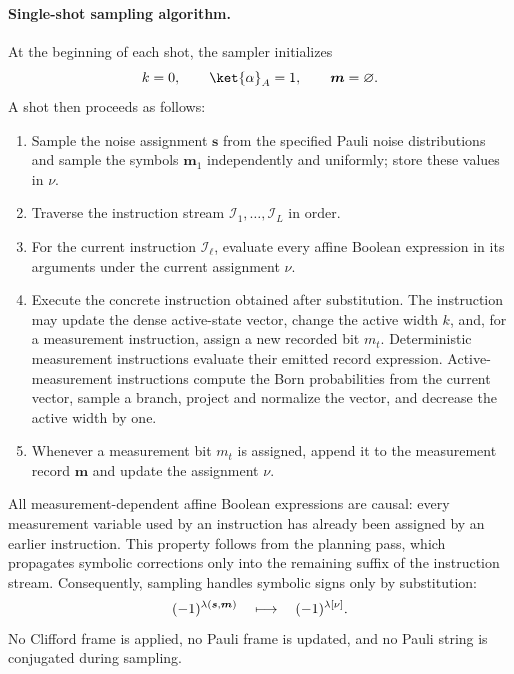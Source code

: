 \documentclass[a4paper,onecolumn,unpublished]{quantumarticle}
\DeclarePairedDelimiter\rbra{\lparen}{\rparen}
\begin{document}
\paragraph{Single-shot sampling algorithm.}
At the beginning of each shot, the sampler initializes
\begin{equation*}
    k=0,
    \qquad
    \ket{\alpha}_A = 1,
    \qquad
    \bm{m}=\varnothing.
\end{equation*}
A shot then proceeds as follows:
\begin{enumerate}
    \item Sample the noise assignment $\bm{s}$ from the specified Pauli noise distributions and sample the symbols $\bm{m}_1$ independently and uniformly; store these values in $\nu$.

    \item Traverse the instruction stream
    $\mathcal{I}_1,\ldots,\mathcal{I}_L$ in order.

    \item For the current instruction $\mathcal{I}_\ell$, evaluate every affine Boolean expression in its arguments under the current assignment $\nu$.

    \item Execute the concrete instruction obtained after substitution. The instruction may update the dense active-state vector, change the active width $k$, and, for a measurement instruction, assign a new recorded bit $m_t$. Deterministic measurement instructions evaluate their emitted record expression. Active-measurement instructions compute the Born probabilities from the current vector, sample a branch, project and normalize the vector, and decrease the active width by one.

    \item Whenever a measurement bit $m_t$ is assigned, append it to the measurement record $\bm{m}$ and update the assignment $\nu$.
\end{enumerate}
All measurement-dependent affine Boolean expressions are causal: every measurement variable used by an instruction has already been assigned by an earlier instruction.
This property follows from the planning pass, which propagates symbolic corrections only into the remaining suffix of the instruction stream.
Consequently, sampling handles symbolic signs only by substitution:
\begin{equation*}
    \rbra{-1}^{\lambda\rbra{\bm{s},\bm{m}}}
    \quad\longmapsto\quad
    \rbra{-1}^{\lambda[\nu]}.
\end{equation*}
No Clifford frame is applied, no Pauli frame is updated, and no Pauli string is conjugated during sampling.
\end{document}
